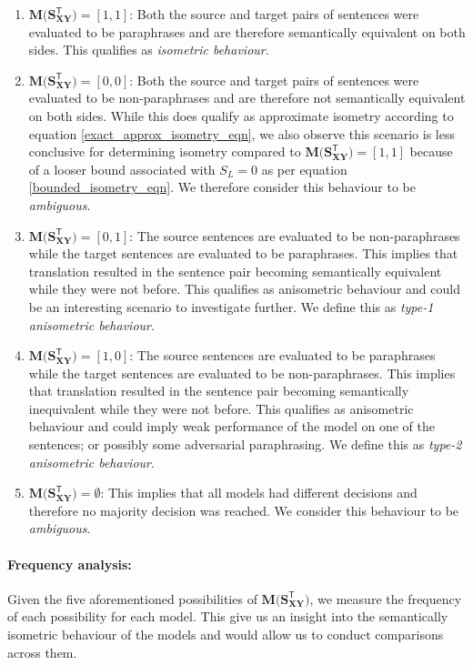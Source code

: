 \documentclass[11pt,a4paper]{article}
\begin{document}
\begin{enumerate}
\item $\mathbf{M(S_{XY}^{\mathsf{T}}}) = [1, 1]$: Both the source and target pairs of sentences were evaluated to be paraphrases and are therefore semantically equivalent on both sides. This qualifies as \textit{isometric behaviour}.
\item $\mathbf{M(S_{XY}^{\mathsf{T}}}) = [0, 0]$: Both the source and target pairs of sentences were evaluated to be non-paraphrases and are therefore not semantically equivalent on both sides. While this does qualify as approximate isometry according to equation \ref{exact_approx_isometry_eqn}, we also observe this scenario is less conclusive for determining isometry compared to $\mathbf{M(S_{XY}^{\mathsf{T}}}) = [1, 1]$ because of a looser bound associated with $S_L=0$ as per equation \ref{bounded_isometry_eqn}. We therefore consider this behaviour to be \textit{ambiguous}.  
\item $\mathbf{M(S_{XY}^{\mathsf{T}}}) = [0, 1]$: The source sentences are evaluated to be non-paraphrases while the target sentences are evaluated to be paraphrases. This implies that translation resulted in the sentence pair becoming semantically equivalent while they were not before. This qualifies as anisometric behaviour and could be an interesting scenario to investigate further. We define this as \textit{type-1 anisometric behaviour}.
\item $\mathbf{M(S_{XY}^{\mathsf{T}}}) = [1, 0]$: The source sentences are evaluated to be paraphrases while the target sentences are evaluated to be non-paraphrases. This implies that translation resulted in the sentence pair becoming semantically inequivalent while they were not before. This qualifies as anisometric behaviour and could imply weak performance of the model on one of the sentences; or possibly some adversarial paraphrasing. We define this as \textit{type-2 anisometric behaviour}.
\item $\mathbf{M(S_{XY}^{\mathsf{T}}}) = \emptyset$: This implies that all models had different decisions and therefore no majority decision was reached. We consider this behaviour to be \textit{ambiguous}.
\end{enumerate}

\paragraph{Frequency analysis:} Given the five aforementioned possibilities of $\mathbf{M(S_{XY}^{\mathsf{T}}})$, we measure the frequency of each possibility for each model. This give us an insight into the semantically isometric behaviour of the models and would allow us to conduct comparisons across them.
\end{document}
